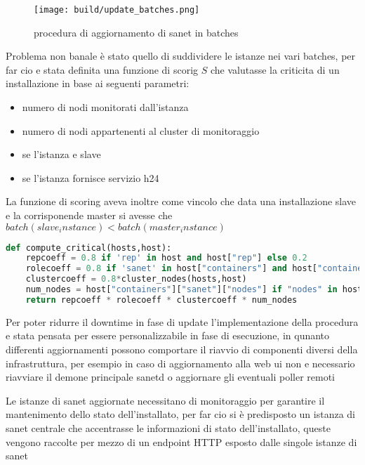 \begin{figure}[H]
    \centering
    \texttt{[image: build/update\_batches.png]}
    \caption{procedura di aggiornamento di sanet in batches}
    \label{fig:enter-label}
\end{figure}

Problema non banale è stato quello di suddividere le istanze nei vari batches, per far cio e stata definita una funzione di scorig \(S\) che valutasse la criticita di un installazione in base ai seguenti parametri:

\begin{itemize}
  \item{numero di nodi monitorati dall'istanza}
  \item{numero di nodi appartenenti al cluster di monitoraggio}
  \item{se l'istanza e slave}
  \item{se l'istanza fornisce servizio h24}
\end{itemize}

\newpage
La funzione di scoring aveva inoltre come vincolo che data una installazione slave e la corrisponende master si avesse che \(batch(slave_instance) \lt batch(master_instance)\)

\begin{lstlisting}[language=python]
def compute_critical(hosts,host):
    repcoeff = 0.8 if 'rep' in host and host["rep"] else 0.2
    rolecoeff = 0.8 if 'sanet' in host["containers"] and host["containers"]["sanet"]["role"] == "prod" else 0.2
    clustercoeff = 0.8*cluster_nodes(hosts,host)
    num_nodes = host["containers"]["sanet"]["nodes"] if "nodes" in host["containers"]["sanet"] else 1
    return repcoeff * rolecoeff * clustercoeff * num_nodes
\end{lstlisting}

Per poter ridurre il downtime in fase di update l'implementazione della procedura e stata pensata per essere personalizzabile in fase di esecuzione, in qunanto differenti aggiornamenti possono comportare il riavvio di componenti diversi della infrastruttura, per esempio in caso di aggiornamento alla web ui non e necessario riavviare il demone principale sanetd o aggiornare gli eventuali poller remoti

Le istanze di sanet aggiornate necessitano di monitoraggio per garantire il mantenimento dello stato dell'installato, per far cio si è predisposto un istanza di sanet centrale che accentrasse le informazioni di stato dell'installato, queste vengono raccolte per mezzo di un endpoint HTTP esposto dalle singole istanze di sanet

